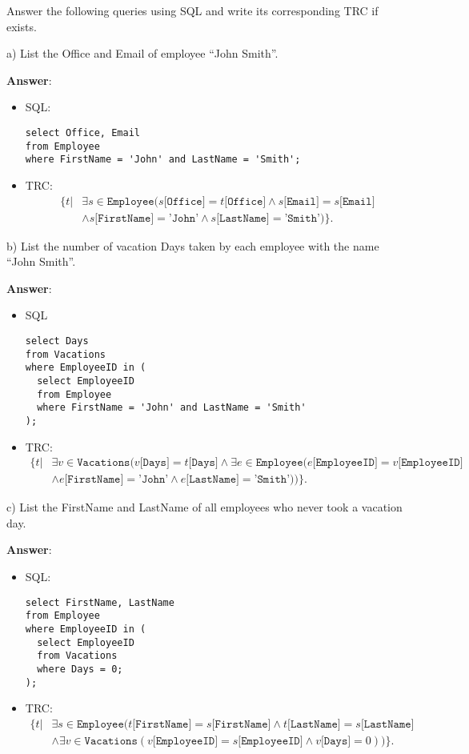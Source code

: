 \documentclass{article}
\begin{document}
Answer the following queries using SQL and write its corresponding TRC if exists.

a) List the Office and Email of employee ``John Smith''.

{\bf Answer}: 
\begin{itemize}
\item SQL:
\begin{verbatim}
select Office, Email
from Employee
where FirstName = 'John' and LastName = 'Smith';
\end{verbatim}

\item TRC:
$$\begin{aligned}
\{t | &\exists s \in \texttt{Employee} (s\texttt{[Office]} = t\texttt{[Office]} \wedge s\texttt{[Email]} = s\texttt{[Email]} \\
&\wedge s\texttt{[FirstName]} = \texttt{'John'} \wedge s\texttt{[LastName]} = \texttt{'Smith'})\}.
\end{aligned}$$
\end{itemize}

b) List the number of vacation Days taken by each employee with the name ``John Smith''.

{\bf Answer}:
\begin{itemize}
\item SQL
\begin{verbatim}
select Days
from Vacations
where EmployeeID in (
  select EmployeeID
  from Employee
  where FirstName = 'John' and LastName = 'Smith'
);
\end{verbatim}

\item TRC:
$$\begin{aligned}
\{t | & \exists v \in \texttt{Vacations} (v\texttt{[Days]} = t\texttt{[Days]}
 \wedge \exists e \in \texttt{Employee} (e\texttt{[EmployeeID]} = v\texttt{[EmployeeID]} \\
&\wedge e\texttt{[FirstName]} = \texttt{'John'} \wedge e\texttt{[LastName]} = \texttt{'Smith'}))\}.
\end{aligned}$$
\end{itemize}


c) List the FirstName and LastName of all employees who never took a vacation day.

{\bf Answer}:
\begin{itemize}
\item SQL:
\begin{verbatim}
select FirstName, LastName
from Employee
where EmployeeID in (
  select EmployeeID
  from Vacations
  where Days = 0;
);
\end{verbatim}

\item TRC:
$$\begin{aligned}
\{t | & \exists s \in \texttt{Employee} (t\texttt{[FirstName]} = s\texttt{[FirstName]} \wedge t\texttt{[LastName]} = s\texttt{[LastName]}\\
& \wedge \exists v \in \texttt{Vacations} (v\texttt{[EmployeeID]} = s\texttt{[EmployeeID]} 
\wedge v\texttt{[Days]} = 0))\}.
\end{aligned}$$
\end{itemize}
\end{document}
